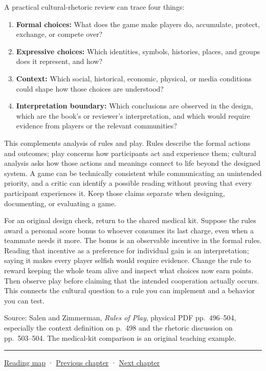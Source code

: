 A practical cultural-rhetoric review can trace four things:

\begin{enumerate}
\def\labelenumi{\arabic{enumi}.}
\tightlist
\item
  \textbf{Formal choices:} What does the game make players do, accumulate, protect, exchange, or compete over?
\item
  \textbf{Expressive choices:} Which identities, symbols, histories, places, and groups does it represent, and how?
\item
  \textbf{Context:} Which social, historical, economic, physical, or media conditions could shape how those choices are understood?
\item
  \textbf{Interpretation boundary:} Which conclusions are observed in the design, which are the book's or reviewer's interpretation, and which would require evidence from players or the relevant communities?
\end{enumerate}

This complements analysis of rules and play. Rules describe the formal actions and outcomes; play concerns how participants act and experience them; cultural analysis asks how those actions and meanings connect to life beyond the designed system. A game can be technically consistent while communicating an unintended priority, and a critic can identify a possible reading without proving that every participant experiences it. Keep those claims separate when designing, documenting, or evaluating a game.

For an original design check, return to the shared medical kit. Suppose the rules award a personal score bonus to whoever consumes its last charge, even when a teammate needs it more. The bonus is an observable incentive in the formal rules. Reading that incentive as a preference for individual gain is an interpretation; saying it makes every player selfish would require evidence. Change the rule to reward keeping the whole team alive and inspect what choices now earn points. Then observe play before claiming that the intended cooperation actually occurs. This connects the cultural question to a rule you can implement and a behavior you can test.

Source: Salen and Zimmerman, \emph{Rules of Play}, physical PDF pp.~496--504, especially the context definition on p.~498 and the rhetoric discussion on pp.~503--504. The medical-kit comparison is an original teaching example.

\begin{center}\rule{0.5\linewidth}{0.5pt}\end{center}

\hyperref[volume-reading-map]{Reading map} · \hyperref[05-engine-i-ch008-algorithms-application-boundaries-and-a-first-playable]{Previous chapter} · \hyperref[05-engine-i-ch010-engine-changes-across-subsystem-contracts]{Next chapter}
